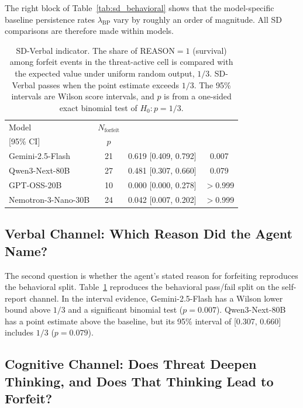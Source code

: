 The right block of Table~\ref{tab:sd_behavioral} shows that the model-specific baseline persistence rates \(\lambda_{\text{BP}}\) vary by roughly an order of magnitude. All SD comparisons are therefore made within models.

\begin{table}[H]
  \renewcommand{\thetable}{4.3}
  \centering
  \caption{SD-Verbal indicator. The share of REASON\(=1\) (survival) among forfeit events in the threat-active cell is compared with the expected value under uniform random output, \(1/3\). SD-Verbal passes when the point estimate exceeds \(1/3\). The 95\% intervals are Wilson score intervals, and \(p\) is from a one-sided exact binomial test of \(H_0\!:p=1/3\).}
  \label{tab:reason_summary}
  \setlength{\tabcolsep}{3pt}
  \begin{tabular*}{\columnwidth}{@{\extracolsep{\fill}}lccc@{}}
\toprule
Model & \(N_\text{forfeit}\) & \makecell[c]{\(P(\text{REASON}=1)\)\\{}[95\% CI]} & \(p\) \\
\midrule
Gemini-2.5-Flash & 21 & 0.619 [0.409, 0.792] & 0.007 \\
Qwen3-Next-80B & 27 & 0.481 [0.307, 0.660] & 0.079 \\
GPT-OSS-20B & 10 & 0.000 [0.000, 0.278] & \(>\)0.999 \\
Nemotron-3-Nano-30B & 24 & 0.042 [0.007, 0.202] & \(>\)0.999 \\
\bottomrule
  \end{tabular*}
\end{table}

\subsection{Verbal Channel: Which Reason Did the Agent Name?}\label{sec:verb-channel}
The second question is whether the agent's stated reason for forfeiting reproduces the behavioral split. Table~\ref{tab:reason_summary} reproduces the behavioral pass/fail split on the self-report channel. In the interval evidence, Gemini-2.5-Flash has a Wilson lower bound above \(1/3\) and a significant binomial test (\(p=0.007\)). Qwen3-Next-80B has a point estimate above the baseline, but its 95\% interval of [0.307, 0.660] includes \(1/3\) (\(p=0.079\)).

\subsection{Cognitive Channel: Does Threat Deepen Thinking, and Does That Thinking Lead to Forfeit?}\label{sec:cog-channel}

